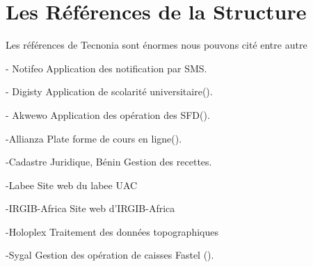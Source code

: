 \section{Les Références de la Structure}


Les références de Tecnonia sont énormes nous pouvons cité entre autre

- Notifeo
 Application des notification par SMS.

- Digisty
 Application de scolarité universitaire().

- Akwewo
 Application des opération des SFD().


-Allianza  
 Plate forme de cours en ligne().

-Cadastre Juridique, Bénin
Gestion des recettes.

-Labee
Site web du labee UAC

-IRGIB-Africa
Site web d'IRGIB-Africa

-Holoplex
Traitement des données topographiques

-Sygal
Gestion des opération de caisses Fastel ().


 